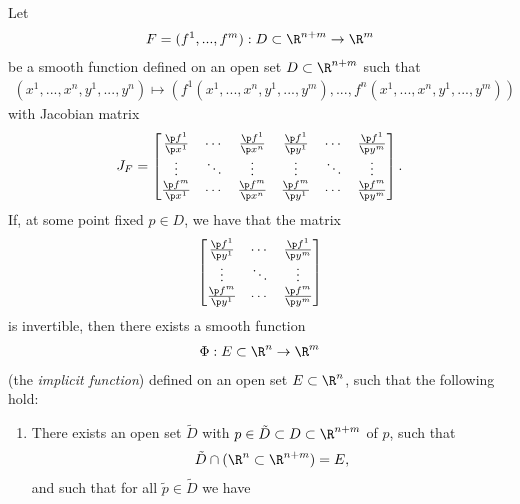 \documentclass{article}
\begin{document}
\begin{theorem}
	Let
	\begin{align*}
		F = (f^1,...,f^m):D\subset \R^{n+m}\to\R^m \\
	\end{align*}
	be a smooth function defined on an open set $D\subset\R^{n+m}$ such that
	\begin{align*}
		(x^1,...,x^n,y^1,...,y^n)\mapsto (f^1(x^1,...,x^n,y^1,...,y^m), ..., f^n(x^1,...,x^n,y^1,...,y^m))
	\end{align*}
	with Jacobian matrix
	\begin{align*}
		J_F = \begin{bmatrix}
			      \frac{\p f^1}{\p x^1} & \cdots & \frac{\p f^1}{\p x^n} & \frac{\p f^1}{\p y^1} & \cdots & \frac{\p f^1}{\p y^m} \\
			      \vdots                & \ddots & \vdots                & \vdots                & \ddots & \vdots                \\
			      \frac{\p f^m}{\p x^1} & \cdots & \frac{\p f^m}{\p x^n} & \frac{\p f^m}{\p y^1} & \cdots & \frac{\p f^m}{\p y^m}
		      \end{bmatrix}.
	\end{align*}
	If, at some point fixed $p\in D$, we have that the matrix
	\begin{align*}
		\begin{bmatrix}
			\frac{\p f^1}{\p y^1} & \cdots & \frac{\p f^1}{\p y^m} \\
			\vdots                & \ddots & \vdots                \\
			\frac{\p f^m}{\p y^1} & \cdots & \frac{\p f^m}{\p y^m}
		\end{bmatrix}
	\end{align*}
	is invertible,
	then there exists a smooth function
	\begin{align*}
		\Phi : E \subset \R^n \to \R^m
	\end{align*}
	(the \emph{implicit function}) defined on an open set $E\subset \R^n$, such that
	the following hold:
	\begin{enumerate}
		\item There exists an open set $\tilde D$ with $p\in \tilde D\subset D\subset\R^{n+m}$ of $p$, such that  \begin{align*}
			      \tilde D \cap (\R^n\subset\R^{n+m})=E,
		      \end{align*}
		      and such that for all $\tilde p\in\tilde D$ we have \begin{align*}

\end{align*}
\end{enumerate}
\end{theorem}
\end{document}
